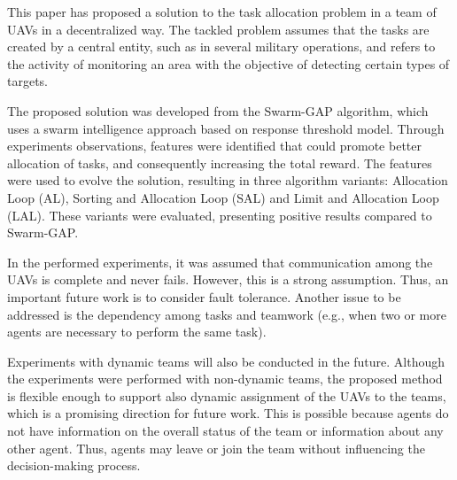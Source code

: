 This paper has proposed a solution to the task allocation problem in a team of UAVs in a decentralized way. The tackled problem assumes that the tasks are created by a central entity, such as in several military operations, and refers to the activity of monitoring an area with the objective of detecting certain types of targets. 

The proposed solution was developed from the Swarm-GAP algorithm, which uses a swarm intelligence approach based on response threshold model. Through experiments observations, features were identified that could promote better allocation of tasks, and consequently increasing the total reward. The features were used to evolve the solution, resulting in three algorithm variants: Allocation Loop (AL), Sorting and Allocation Loop (SAL) and Limit and Allocation Loop (LAL). These variants were evaluated, presenting positive results compared to Swarm-GAP.

In the performed experiments, it was assumed that communication among the UAVs is complete and never fails. However, this is a strong assumption. Thus, an important future work is to consider fault tolerance. Another issue to be addressed  is the dependency among tasks and teamwork (e.g., when two or more agents are necessary to perform the same task). 

Experiments with dynamic teams will also be conducted in the future. Although the experiments were performed with non-dynamic teams, the proposed method is flexible enough to support also dynamic assignment of the UAVs to the teams, which is a promising direction for future work. This is possible because agents do not have information on the overall status of the team or information about any other agent. Thus, agents may leave or join the team without influencing the decision-making process.